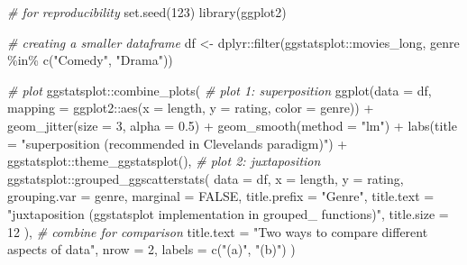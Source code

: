 \documentclass[
]{article}
\newenvironment{Shaded}{\begin{snugshade}}{\end{snugshade}}
\newcommand{\AttributeTok}[1]{\textcolor[rgb]{0.77,0.63,0.00}{#1}}
\newcommand{\CommentTok}[1]{\textcolor[rgb]{0.56,0.35,0.01}{\textit{#1}}}
\newcommand{\ConstantTok}[1]{\textcolor[rgb]{0.00,0.00,0.00}{#1}}
\newcommand{\DecValTok}[1]{\textcolor[rgb]{0.00,0.00,0.81}{#1}}
\newcommand{\FloatTok}[1]{\textcolor[rgb]{0.00,0.00,0.81}{#1}}
\newcommand{\FunctionTok}[1]{\textcolor[rgb]{0.00,0.00,0.00}{#1}}
\newcommand{\NormalTok}[1]{#1}
\newcommand{\OtherTok}[1]{\textcolor[rgb]{0.56,0.35,0.01}{#1}}
\newcommand{\SpecialCharTok}[1]{\textcolor[rgb]{0.00,0.00,0.00}{#1}}
\newcommand{\StringTok}[1]{\textcolor[rgb]{0.31,0.60,0.02}{#1}}
\begin{document}
\begin{Shaded}
\begin{Highlighting}[]
\CommentTok{\# for reproducibility}
\FunctionTok{set.seed}\NormalTok{(}\DecValTok{123}\NormalTok{)}
\FunctionTok{library}\NormalTok{(ggplot2)}

\CommentTok{\# creating a smaller dataframe}
\NormalTok{df }\OtherTok{\textless{}{-}}\NormalTok{ dplyr}\SpecialCharTok{::}\FunctionTok{filter}\NormalTok{(ggstatsplot}\SpecialCharTok{::}\NormalTok{movies\_long, genre }\SpecialCharTok{\%in\%} \FunctionTok{c}\NormalTok{(}\StringTok{"Comedy"}\NormalTok{, }\StringTok{"Drama"}\NormalTok{))}

\CommentTok{\# plot}
\NormalTok{ggstatsplot}\SpecialCharTok{::}\FunctionTok{combine\_plots}\NormalTok{(}
  \CommentTok{\# plot 1: superposition}
  \FunctionTok{ggplot}\NormalTok{(}\AttributeTok{data =}\NormalTok{ df, }\AttributeTok{mapping =}\NormalTok{ ggplot2}\SpecialCharTok{::}\FunctionTok{aes}\NormalTok{(}\AttributeTok{x =}\NormalTok{ length, }\AttributeTok{y =}\NormalTok{ rating, }\AttributeTok{color =}\NormalTok{ genre)) }\SpecialCharTok{+}
    \FunctionTok{geom\_jitter}\NormalTok{(}\AttributeTok{size =} \DecValTok{3}\NormalTok{, }\AttributeTok{alpha =} \FloatTok{0.5}\NormalTok{) }\SpecialCharTok{+}
    \FunctionTok{geom\_smooth}\NormalTok{(}\AttributeTok{method =} \StringTok{"lm"}\NormalTok{) }\SpecialCharTok{+}
    \FunctionTok{labs}\NormalTok{(}\AttributeTok{title =} \StringTok{"superposition (recommended in Cleveland\textquotesingle{}s paradigm)"}\NormalTok{) }\SpecialCharTok{+}
\NormalTok{    ggstatsplot}\SpecialCharTok{::}\FunctionTok{theme\_ggstatsplot}\NormalTok{(),}
  \CommentTok{\# plot 2: juxtaposition}
\NormalTok{  ggstatsplot}\SpecialCharTok{::}\FunctionTok{grouped\_ggscatterstats}\NormalTok{(}
    \AttributeTok{data =}\NormalTok{ df,}
    \AttributeTok{x =}\NormalTok{ length,}
    \AttributeTok{y =}\NormalTok{ rating,}
    \AttributeTok{grouping.var =}\NormalTok{ genre,}
    \AttributeTok{marginal =} \ConstantTok{FALSE}\NormalTok{,}
    \AttributeTok{title.prefix =} \StringTok{"Genre"}\NormalTok{,}
    \AttributeTok{title.text =} \StringTok{"juxtaposition (\textasciigrave{}ggstatsplot\textasciigrave{} implementation in \textasciigrave{}grouped\_\textasciigrave{} functions)"}\NormalTok{,}
    \AttributeTok{title.size =} \DecValTok{12}
\NormalTok{  ),}
  \CommentTok{\# combine for comparison}
  \AttributeTok{title.text =} \StringTok{"Two ways to compare different aspects of data"}\NormalTok{,}
  \AttributeTok{nrow =} \DecValTok{2}\NormalTok{,}
  \AttributeTok{labels =} \FunctionTok{c}\NormalTok{(}\StringTok{"(a)"}\NormalTok{, }\StringTok{"(b)"}\NormalTok{)}
\NormalTok{)}
\end{Highlighting}
\end{Shaded}
\end{document}
